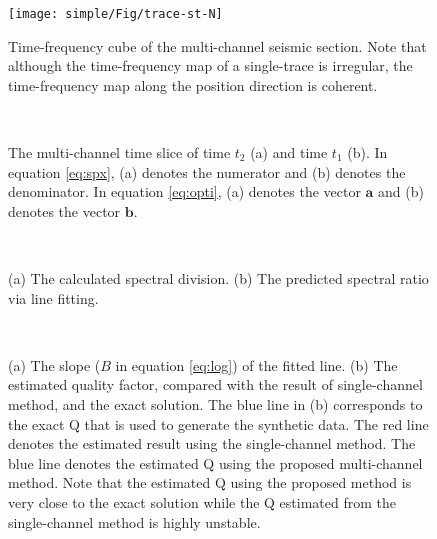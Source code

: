 \begin{figure}[htb!]
	\centering
	\texttt{[image: simple/Fig/trace-st-N]}
	\caption{Time-frequency cube of the multi-channel seismic section. Note that although the time-frequency map of a single-trace is irregular, the time-frequency map along the position direction is coherent. }
	\label{fig:trace-st-N}
\end{figure}


\begin{figure}[htb!]
	\centering
	\\
	\caption{The multi-channel time slice of time $t_2$ (a) and time $t_1$ (b). In equation \ref{eq:spx}, (a) denotes the numerator and (b) denotes the denominator. In equation \ref{eq:opti}, (a) denotes the vector $\mathbf{a}$ and (b) denotes the vector $\mathbf{b}$.}
	\label{fig:trace-f-t2-N,trace-f-t1-N}
\end{figure}


\begin{figure}[htb!]
	\centering
	\\
	\caption{(a) The calculated spectral division. (b) The predicted spectral ratio via line fitting.}
	\label{fig:trace-ratio-N,trace-lsfits}
\end{figure}


\begin{figure}[htb!]
	\centering
	\\
	\caption{(a) The slope ($B$ in equation \ref{eq:log}) of the fitted line. (b) The estimated quality factor, compared with the result of single-channel method, and the exact solution. The blue line in (b) corresponds to the exact Q that is used to generate the synthetic data. The red line denotes the estimated result using the single-channel method.  The blue line denotes the estimated Q using the proposed multi-channel method. Note that the estimated Q using the proposed method is very close to the exact solution while the Q estimated from the single-channel method is highly unstable. }
	\label{fig:trace-coef-N,trace-comp}
\end{figure}




